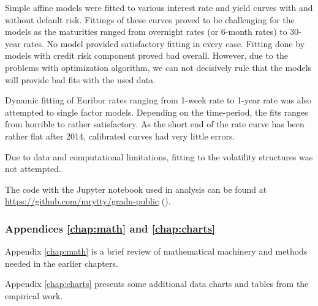 Simple affine models were fitted to various interest rate and yield curves with and without default risk. Fittings of these curves proved to be challenging for the models as the maturities ranged from overnight rates (or 6-month rates) to 30-year rates. No model provided satisfactory fitting in every case. Fitting done by models with credit risk component proved bad overall. However, due to the problems with optimization algorithm, we can not decisively rule that the models will provide bad fits with the used data.

Dynamic fitting of Euribor rates ranging from 1-week rate to 1-year rate was also attempted to single factor models. Depending on the time-period, the fits ranges from horrible to rather satisfactory. As the short end of the rate curve has been rather flat after 2014, calibrated curves had very little errors.

Due to data and computational limitations, fitting to the volatility structures was not attempted.  

The code with the Jupyter notebook used in analysis can be found at \url{https://github.com/mrytty/gradu-public} (\textcite{rytty}).

\subsubsection*{Appendices \ref{chap:math} and \ref{chap:charts}}

Appendix \ref{chap:math} is a brief review of mathematical machinery and methods needed in the earlier chapters.

Appendix \ref{chap:charts} presents some additional data charts and tables from the empirical work. 
